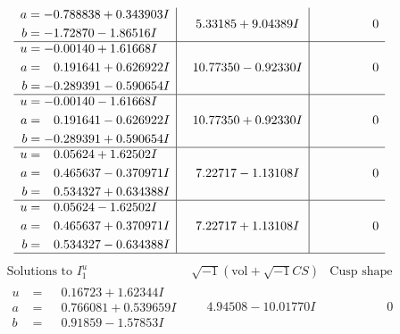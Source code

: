 \documentclass[1p]{elsarticle_modified}
\theoremstyle{definition}
\newcommand{\I}{\sqrt{-1}}
\begin{document}
$$\begin{array}{c|c|c}
\begin{aligned}
a &= -0.788838 + 0.343903 I \\
b &= -1.72870 - 1.86516 I\end{aligned}
 & \phantom{-}5.33185 + 9.04389 I & \phantom{-0.000000 } 0 \\ \hline\begin{aligned}
u &= -0.00140 + 1.61668 I \\
a &= \phantom{-}0.191641 + 0.626922 I \\
b &= -0.289391 - 0.590654 I\end{aligned}
 & \phantom{-}10.77350 - 0.92330 I & \phantom{-0.000000 } 0 \\ \hline\begin{aligned}
u &= -0.00140 - 1.61668 I \\
a &= \phantom{-}0.191641 - 0.626922 I \\
b &= -0.289391 + 0.590654 I\end{aligned}
 & \phantom{-}10.77350 + 0.92330 I & \phantom{-0.000000 } 0 \\ \hline\begin{aligned}
u &= \phantom{-}0.05624 + 1.62502 I \\
a &= \phantom{-}0.465637 - 0.370971 I \\
b &= \phantom{-}0.534327 + 0.634388 I\end{aligned}
 & \phantom{-}7.22717 - 1.13108 I & \phantom{-0.000000 } 0 \\ \hline\begin{aligned}
u &= \phantom{-}0.05624 - 1.62502 I \\
a &= \phantom{-}0.465637 + 0.370971 I \\
b &= \phantom{-}0.534327 - 0.634388 I\end{aligned}
 & \phantom{-}7.22717 + 1.13108 I & \phantom{-0.000000 } 0\\
 \hline 
 \end{array}$$\newpage$$\begin{array}{c|c|c}  
\text{Solutions to }I^u_{1}& \I (\text{vol} + \sqrt{-1}CS) & \text{Cusp shape}\\
 \hline 
\begin{aligned}
u &= \phantom{-}0.16723 + 1.62344 I \\
a &= \phantom{-}0.766081 + 0.539659 I \\
b &= \phantom{-}0.91859 - 1.57853 I\end{aligned}
 & \phantom{-}4.94508 - 10.01770 I & \phantom{-0.000000 } 0 \\ \hline\begin{aligned}

\end{aligned}
\end{array}$$
\end{document}

